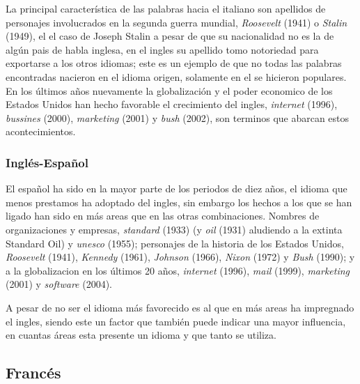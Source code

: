 La principal característica de las palabras hacia el italiano son apellidos de personajes involucrados en la segunda guerra mundial, \textit{Roosevelt} (1941) o \textit{Stalin} (1949), el el caso de Joseph Stalin a pesar de que su nacionalidad no es la de algún pais de habla inglesa, en el ingles su apellido tomo notoriedad para exportarse a los otros idiomas; este es un ejemplo de que no todas las palabras encontradas nacieron en el idioma origen,  solamente en el se hicieron populares.  En los últimos años nuevamente la globalización y el poder economico de los Estados Unidos han hecho favorable el crecimiento del ingles, \textit{internet} (1996), \textit{bussines} (2000), \textit{marketing} (2001) y \textit{bush} (2002), son terminos que abarcan estos acontecimientos. 


\subsubsection*{Inglés-Español}


El español ha sido en la mayor parte de los periodos de diez años,  el idioma que menos prestamos ha adoptado del ingles, sin embargo los hechos a los que se han ligado han sido en más areas que en las otras combinaciones.  Nombres de organizaciones y empresas,  \textit{standard} (1933) (y \textit{oil} (1931) aludiendo a la extinta Standard Oil) y \textit{unesco} (1955);  personajes de la historia de los Estados Unidos,  \textit{Roosevelt} (1941), \textit{Kennedy} (1961), \textit{Johnson} (1966),  \textit{Nixon} (1972) y \textit{Bush} (1990); y a la globalizacion en los últimos 20 años, \textit{internet} (1996), \textit{mail} (1999), \textit{marketing} (2001) y \textit{software} (2004).   

A pesar de no ser el idioma más favorecido es al que en más areas ha impregnado el ingles, siendo este un factor que también puede indicar una mayor influencia,  en cuantas áreas esta presente un idioma y que tanto se utiliza. 



\newpage
\subsection{Francés}

